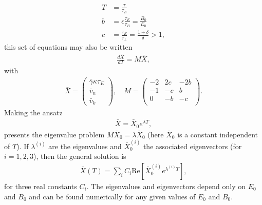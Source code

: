 \documentclass[amsmath,amssymb,nofootinbib,notitlepage,superscriptaddress,twocolumn]{revtex4-2}
\begin{document}
\begin{align}
    T & = \frac{\tau}{\tau_E} \\
    b & = \epsilon\frac{\tau_E}{\tau_B} = \frac{B_0}{E_0} \label{b} \\
    c & = \frac{\tau_E}{\tau_\perp} = \frac{1+\delta}{\delta} > 1, \label{c}
\end{align}
this set of equations may also be written
\begin{align}
\frac{d \bar{X}}{dT} = M \bar{X},
\end{align}
with
\begin{align}
    \bar{X} = \begin{pmatrix}
        \bar{\gamma} \kappa \tau_E \\ \bar{v}_n \\ \bar{v}_k 
    \end{pmatrix}, \quad
    M = \begin{pmatrix}
        -2 & 2c & -2b \\
    -1 &-c & b  \\
    0 &-b & -c \\
    \end{pmatrix}.
\end{align}
Making the ansatz
\begin{align}
\bar{X}=\bar{X}_0 e^{\lambda T},
\end{align}
presents the eigenvalue problem $M \bar{X}_0=\lambda \bar{X}_0$ (here $\bar{X}_0$ is a constant independent of $T$).  If $\lambda^{(i)}$ are the eigenvalues and $\bar{X}^{(i)}_0$ the associated eigenvectors (for $i=1,2,3$), then the general solution is
\begin{align}\label{near_equilibrium}
    \bar{X}(T) = \sum_i C_i \textrm{Re}[\bar{X}_0^{(i)} e^{\lambda^{(i)} T}],
\end{align}
for three real constants $C_i$.
The eigenvalues and eigenvectors depend only on $E_0$ and $B_0$ and can be found numerically for any given values of $E_0$ and $B_0$.
\end{document}

